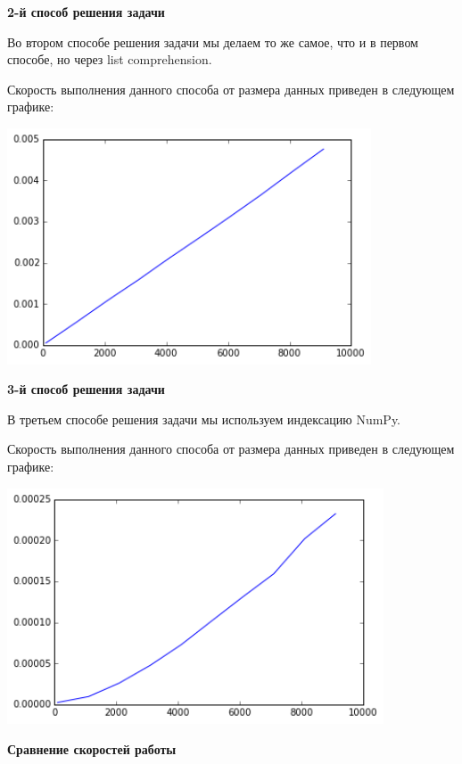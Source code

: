 \documentclass[12pt, a4paper]{article}
\begin{document}
			{\bf 2-й способ решения задачи\\}

				Во втором способе решения задачи мы делаем то же самое, что и в первом способе, но через list comprehension.

				Скорость выполнения данного способа от размера данных приведен в следующем графике:
				\begin{center}
					\includegraphics[height=7cm]{timeit/num2_ti2.png}
				\end{center}


			{\bf 3-й способ решения задачи\\}

				В третьем способе решения задачи мы используем индексацию NumPy.

				Скорость выполнения данного способа от размера данных приведен в следующем графике:
				\begin{center}
					\includegraphics[height=7cm]{timeit/num2_ti3.png}
				\end{center}


			{\bf Сравнение скоростей работы\\}
\end{document}
